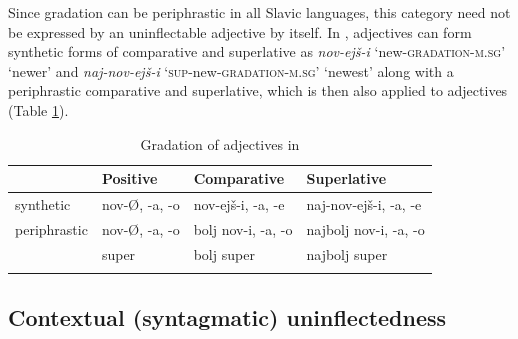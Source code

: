 \documentclass[output=paper,colorlinks,citecolor=brown]{langscibook}
\begin{document}
Since gradation can be periphrastic in all Slavic languages, this category need not be expressed by an uninflectable adjective by itself. In , adjectives can form synthetic forms of comparative and superlative as \emph{nov-ejš-i} `new-\textsc{gradation-m.sg}' `newer' and \emph{naj-nov-ejš-i} `\textsc{sup}-new-\textsc{gradation-m.sg}' `newest' along with a periphrastic comparative and superlative, which is then also applied to  adjectives (Table \ref{03tab5}).

\begin{table}[ht]
	\centering
	\begin{tabularx}{\textwidth}{lXXX}
		\lsptoprule
			& Positive & Comparative & Superlative \\
			\midrule
			synthetic & nov-Ø, -a, -o & nov-ejš-i, -a, -e & naj-nov-ejš-i, -a, -e \\
			periphrastic & nov-Ø, -a, -o & bolj nov-i, -a, -o & najbolj nov-i, -a, -o \\
			& super & bolj super & najbolj super \\
		\lspbottomrule
	\end{tabularx}
	\caption{Gradation of adjectives in }
	\label{03tab5}
\end{table}

\subsection{Contextual (syntagmatic) uninflectedness} \label{03sec3.3}
\end{document}
